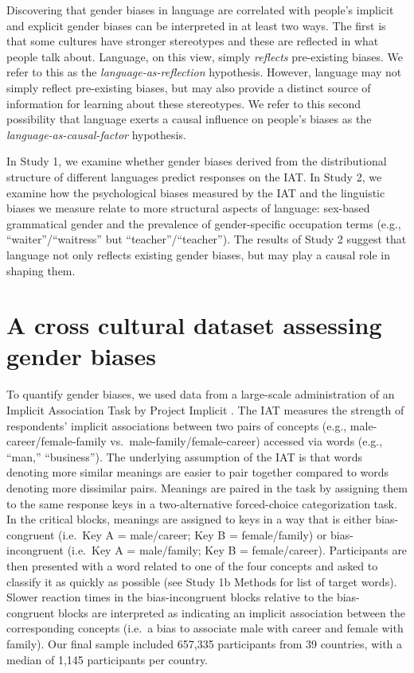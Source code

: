 \documentclass[9pt,twocolumn,twoside,lineno]{pnas-new}
\begin{document}
Discovering that gender biases in language are correlated with people’s implicit and explicit gender biases can be interpreted in at least two ways.  The first is that some cultures have stronger stereotypes and these are reflected in what people talk
about. Language, on this view, simply \emph{reflects} pre-existing
biases. We refer to this as the \emph{language-as-reflection}
hypothesis. However, language may not simply reflect pre-existing
biases, but may also provide a distinct source of information for
learning about these stereotypes. We refer to this second possibility
that language exerts a causal influence on people's biases as the
\emph{language-as-causal-factor} hypothesis.

In Study 1, we examine whether gender biases derived from the distributional structure of different languages predict responses on the IAT. In Study 2, we examine how the psychological
biases measured by the IAT and the linguistic biases we measure relate
to more structural aspects of language: sex-based grammatical gender and
the prevalence of gender-specific occupation terms (e.g.,
\enquote{waiter}/\enquote{waitress} but
\enquote{teacher}/\enquote{teacher}). The results of Study 2 suggest
that language not only reflects existing gender biases, but may play a
causal role in shaping them.

\section*{A cross cultural dataset assessing gender biases}\label{description-of-cross-cultural-dataset-of-psychological-gender-bias}

To quantify gender biases, we used data from a large-scale administration of an Implicit Association Task \citep[IAT,][]{greenwald1998measuring} by Project Implicit \cite[\url{https://implicit.harvard.edu/implicit/}]{nosek2002harvesting}. The IAT measures the strength of respondents' implicit associations between two pairs of concepts (e.g., male-career/female-family vs.~male-family/female-career) accessed via
words (e.g., \enquote{man,} \enquote{business}). The underlying
assumption of the IAT is that words denoting more similar meanings
are easier to pair together compared to words denoting more dissimilar pairs. Meanings are paired in the task by assigning them to the same response
keys in a two-alternative forced-choice categorization task. In the
critical blocks, meanings are assigned to keys in a way that
is either bias-congruent (i.e.~Key A = male/career; Key B =
female/family) or bias-incongruent (i.e.~Key A = male/family; Key B =
female/career). Participants are then presented with a word related to
one of the four concepts and asked to classify it as quickly as possible
(see Study 1b Methods for list of target words). Slower reaction times
in the bias-incongruent blocks relative to the bias-congruent blocks are
interpreted as indicating an implicit association between the
corresponding concepts (i.e.~a bias to associate male with career and
female with family). Our final sample included 657,335 participants from 39 countries, with a
median of 1,145 participants per country.
\end{document}
